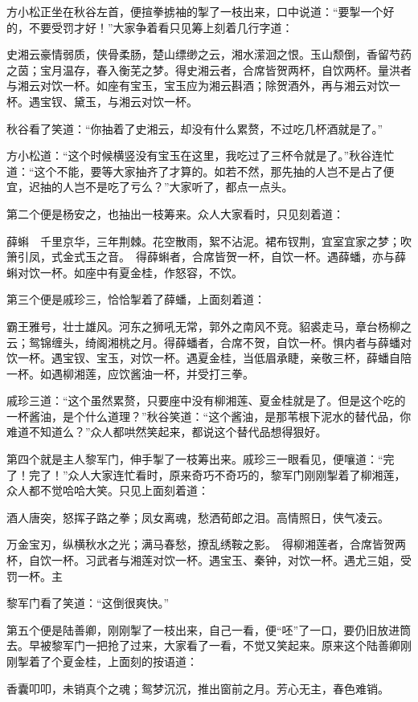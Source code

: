 \documentclass[12pt,UTF8]{ctexbook}
\begin{document}
{{{方小松正坐在秋谷左首，便揎拳掳袖的掣了一枝出来，口中说道：“要掣一个好的，不要受罚才好！”大家争着看只见筹上刻着几行字道：

史湘云豪情弱质，侠骨柔肠，楚山缥缈之云，湘水潆洄之恨。玉山颓倒，香留芍药之茵；宝月温存，春入衡芜之梦。得史湘云者，合席皆贺两杯，自饮两杯。量洪者与湘云对饮一杯。如座有宝玉，宝玉应为湘云斟酒；除贺酒外，再与湘云对饮一杯。遇宝钗、黛玉，与湘云对饮一杯。

秋谷看了笑道：“你抽着了史湘云，却没有什么累赘，不过吃几杯酒就是了。”

方小松道：“这个时候横竖没有宝玉在这里，我吃过了三杯令就是了。”秋谷连忙道：“这个不能，要等大家抽齐了才算的。如若不然，那先抽的人岂不是占了便宜，迟抽的人岂不是吃了亏么？”大家听了，都点一点头。

第二个便是杨安之，也抽出一枝筹来。众人大家看时，只见刻着道：

薛蝌　千里京华，三年荆棘。花空散雨，絮不沾泥。裙布钗荆，宜室宜家之梦；吹箫引凤，式金式玉之音。　得薛蝌者，合席皆贺一杯，自饮一杯。遇薛蟠，亦与薛蝌对饮一杯。如座中有夏金桂，作怒容，不饮。

第三个便是戚珍三，恰恰掣着了薛蟠，上面刻着道：

霸王雅号，壮士雄风。河东之狮吼无常，郭外之南风不竞。貂裘走马，章台杨柳之云；鸳锦缠头，绮阁湘桃之月。得薛蟠者，合席不贺，自饮一杯。惧内者与薛蟠对饮一杯。遇宝钗、宝玉，对饮一杯。遇夏金桂，当低眉承睫，亲敬三杯，薛蟠自陪一杯。如遇柳湘莲，应饮酱油一杯，并受打三拳。

戚珍三道：“这个虽然累赘，只要座中没有柳湘莲、夏金桂就是了。但是这个吃的一杯酱油，是个什么道理？”秋谷笑道：“这个酱油，是那苇根下泥水的替代品，你难道不知道么？”众人都哄然笑起来，都说这个替代品想得狠好。

第四个就是主人黎军门，伸手掣了一枝筹出来。戚珍三一眼看见，便嚷道：“完了！完了！”众人大家连忙看时，原来奇巧不奇巧的，黎军门刚刚掣着了柳湘莲，众人都不觉哈哈大笑。只见上面刻着道：

酒人唐突，怒挥子路之拳；凤女离魂，愁洒荀郎之泪。高情照日，侠气凌云。

万金宝刃，纵横秋水之光；满马春愁，撩乱绣鞍之影。　得柳湘莲者，合席皆贺两杯，自饮一杯。习武者与湘莲对饮一杯。遇宝玉、秦钟，对饮一杯。遇尤三姐，受罚一杯。主

黎军门看了笑道：“这倒很爽快。”

第五个便是陆善卿，刚刚掣了一枝出来，自己一看，便“呸”了一口，要仍旧放进筒去。早被黎军门一把抢了过来，大家看了一看，不觉又笑起来。原来这个陆善卿刚刚掣着了个夏金桂，上面刻的按语道：

香囊叩叩，未销真个之魂；鸳梦沉沉，推出窗前之月。芳心无主，春色难销。

}}}
\end{document}
